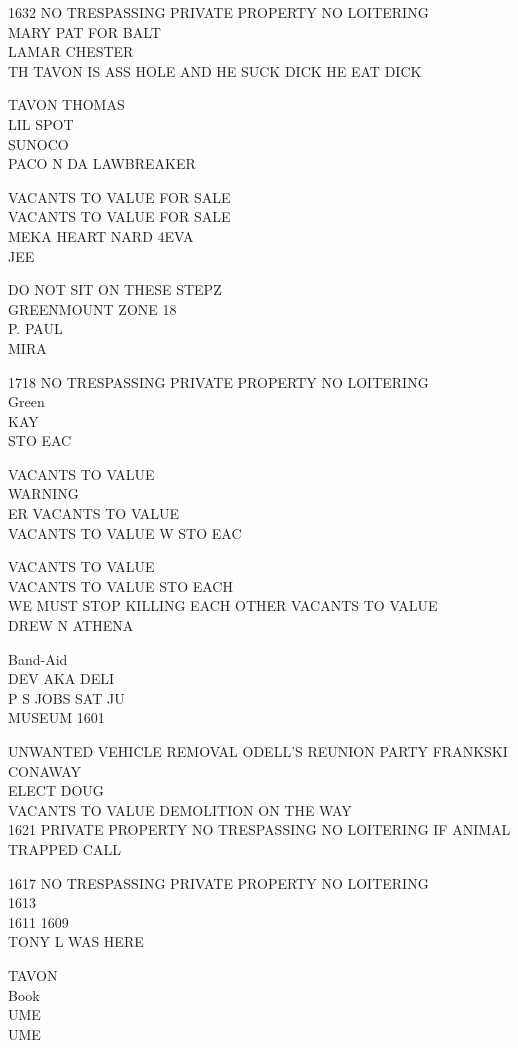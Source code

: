 \documentclass[10pt,letterpaper]{article}
\begin{document}
1632 NO TRESPASSING PRIVATE PROPERTY NO LOITERING\\
MARY PAT FOR BALT\\
LAMAR CHESTER\\
TH TAVON IS ASS HOLE AND HE SUCK DICK HE EAT DICK

TAVON THOMAS\\
LIL SPOT\\
SUNOCO\\
PACO N DA LAWBREAKER

VACANTS TO VALUE FOR SALE\\
VACANTS TO VALUE FOR SALE\\
MEKA HEART NARD 4EVA\\
JEE

DO NOT SIT ON THESE STEPZ\\
GREENMOUNT ZONE 18\\
P. PAUL\\
MIRA

1718 NO TRESPASSING PRIVATE PROPERTY NO LOITERING\\
Green\\
KAY\\
STO EAC

VACANTS TO VALUE\\
WARNING\\
ER VACANTS TO VALUE\\
VACANTS TO VALUE W STO EAC

VACANTS TO VALUE\\
VACANTS TO VALUE STO EACH\\
WE MUST STOP KILLING EACH OTHER VACANTS TO VALUE\\
DREW N ATHENA

Band{-}Aid\\
DEV AKA DELI\\
P S JOBS SAT JU\\
MUSEUM 1601

UNWANTED VEHICLE REMOVAL ODELL'S REUNION PARTY FRANKSKI CONAWAY\\
ELECT DOUG\\
VACANTS TO VALUE DEMOLITION ON THE WAY\\
1621 PRIVATE PROPERTY NO TRESPASSING NO LOITERING IF ANIMAL TRAPPED CALL

1617 NO TRESPASSING PRIVATE PROPERTY NO LOITERING\\
1613\\
1611 1609\\
TONY L WAS HERE

TAVON\\
Book\\
UME\\
UME
\end{document}
